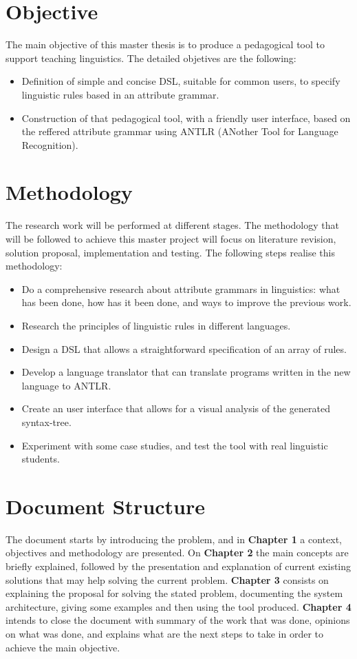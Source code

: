 	
\section{Objective}
The main objective of this master thesis is to produce a pedagogical tool to support teaching linguistics. The detailed objetives are the following:

\begin{itemize}
    \item Definition of simple and concise \textsc{DSL}, suitable for common users, to specify linguistic rules based in an attribute grammar.
    \item Construction of that pedagogical tool, with a friendly user interface, based on the reffered attribute grammar using \textsc{ANTLR} (ANother Tool for Language Recognition).
\end{itemize}
    
\section{Methodology}
The research work will be performed at different stages. The methodology that will be followed to achieve this master project will focus on literature revision, solution proposal, implementation and testing. The following steps realise this methodology:

\begin{itemize}
    \item Do a comprehensive research about attribute grammars in linguistics: what has been done, how has it been done, and ways to improve the previous work.
    \item Research the principles of linguistic rules in different languages.
    \item Design a \textsc{DSL} that allows a straightforward specification of an array of rules.
    \item Develop a language translator that can translate programs written in the new language to \textsc{ANTLR}.
    \item Create an user interface that allows for a visual analysis of the generated syntax-tree.
    \item Experiment with some case studies, and test the tool with real linguistic students.
\end{itemize}
    
\section{Document Structure}
The document starts by introducing the problem, and in \textbf{Chapter 1} a context, objectives and methodology are presented.
On \textbf{Chapter 2} the main concepts are briefly explained, followed by the presentation and explanation of current existing solutions that may help solving the current problem.
\textbf{Chapter 3} consists on explaining the proposal for solving the stated problem, documenting the system architecture, giving some examples and then using the tool produced.
\textbf{Chapter 4} intends to close the document with summary of the work that was done, opinions on what was done, and explains what are the next steps to take in order to achieve the main objective.